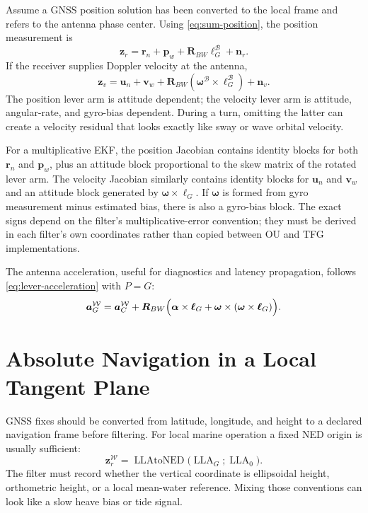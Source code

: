 \documentclass[conference]{IEEEtran}
\DeclareRobustCommand{\vct}[1]{\bm{#1}}
\DeclareRobustCommand{\mat}[1]{\bm{#1}}
\begin{document}
Assume a GNSS position solution has been converted to the local frame and refers to
the antenna phase center.  Using \cref{eq:sum-position}, the position measurement is
\begin{equation}
\boxed{
\vct z_r
=\vct r_n+\vct p_w
 +\mat R_{BW}\vct\ell_G^{\mathcal B}
 +\vct n_r.}
\label{eq:gnss-position}
\end{equation}
If the receiver supplies Doppler velocity at the antenna,
\begin{equation}
\boxed{
\vct z_v
=\vct u_n+\vct v_w
 +\mat R_{BW}
   (\vct\omega^{\mathcal B}\times\vct\ell_G^{\mathcal B})
 +\vct n_v.}
\label{eq:gnss-velocity}
\end{equation}
The position lever arm is attitude dependent; the velocity lever arm is attitude,
angular-rate, and gyro-bias dependent.  During a turn, omitting the latter can create
a velocity residual that looks exactly like sway or wave orbital velocity.

For a multiplicative EKF, the position Jacobian contains identity blocks for both
$\vct r_n$ and $\vct p_w$, plus an attitude block proportional to the skew matrix of
the rotated lever arm.  The velocity Jacobian similarly contains identity blocks for
$\vct u_n$ and $\vct v_w$ and an attitude block generated by
$\vct\omega\times\vct\ell_G$.  If $\vct\omega$ is formed from gyro measurement minus
estimated bias, there is also a gyro-bias block.  The exact signs depend on the
filter's multiplicative-error convention; they must be derived in each filter's own
coordinates rather than copied between OU and TFG implementations.

The antenna acceleration, useful for diagnostics and latency propagation, follows
\cref{eq:lever-acceleration} with $P=G$:
\begin{equation}
\vct a_G^{\mathcal W}=\vct a_C^{\mathcal W}
+\mat R_{BW}\Bigl(
\vct\alpha\times\vct\ell_G
+\vct\omega\times(\vct\omega\times\vct\ell_G)
\Bigr).
\label{eq:gnss-antenna-acc}
\end{equation}

\section{Absolute Navigation in a Local Tangent Plane}
\label{sec:absolute-navigation}

GNSS fixes should be converted from latitude, longitude, and height to a declared
navigation frame before filtering.  For local marine operation a fixed NED origin is
usually sufficient:
\begin{equation}
\vct z_r^{\mathcal W}
=\operatorname{LLAtoNED}
\bigl(\operatorname{LLA}_{G};\operatorname{LLA}_0\bigr).
\label{eq:lla-ned}
\end{equation}
The filter must record whether the vertical coordinate is ellipsoidal height,
orthometric height, or a local mean-water reference.  Mixing those conventions can
look like a slow heave bias or tide signal.
\end{document}
